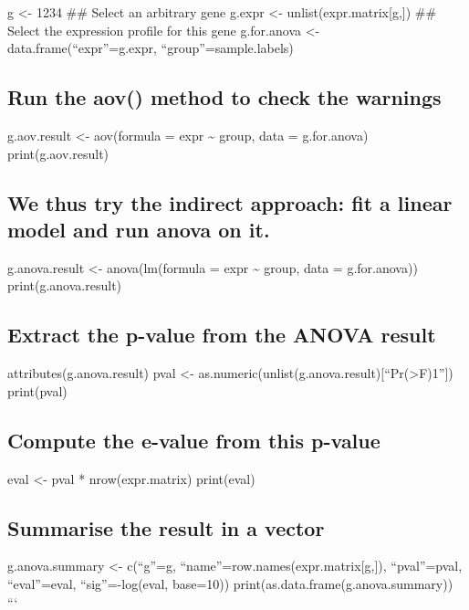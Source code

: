 g \textless{}- 1234 \#\# Select an arbitrary gene g.expr \textless{}-
unlist(expr.matrix{[}g,{]}) \#\# Select the expression profile for this
gene g.for.anova \textless{}- data.frame(``expr''=g.expr,
``group''=sample.labels)

\subsection{Run the aov() method to check the
warnings}\label{run-the-aov-method-to-check-the-warnings}

g.aov.result \textless{}- aov(formula = expr \textasciitilde{} group,
data = g.for.anova) print(g.aov.result)

\subsection{We thus try the indirect approach: fit a linear model and
run anova on
it.}\label{we-thus-try-the-indirect-approach-fit-a-linear-model-and-run-anova-on-it.}

g.anova.result \textless{}- anova(lm(formula = expr \textasciitilde{}
group, data = g.for.anova)) print(g.anova.result)

\subsection{Extract the p-value from the ANOVA
result}\label{extract-the-p-value-from-the-anova-result}

attributes(g.anova.result) pval \textless{}-
as.numeric(unlist(g.anova.result){[}``Pr(\textgreater{}F)1''{]})
print(pval)

\subsection{Compute the e-value from this
p-value}\label{compute-the-e-value-from-this-p-value}

eval \textless{}- pval * nrow(expr.matrix) print(eval)

\subsection{Summarise the result in a
vector}\label{summarise-the-result-in-a-vector}

g.anova.summary \textless{}- c(``g''=g,
``name''=row.names(expr.matrix{[}g,{]}), ``pval''=pval, ``eval''=eval,
``sig''=-log(eval, base=10)) print(as.data.frame(g.anova.summary)) ```

